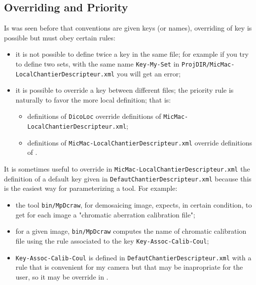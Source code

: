 \subsection{Overriding and Priority} 

Is was seen before that conventions are given keys (or names), overriding
of key is possible but must obey certain rules:

\begin{itemize}
   \item it is not possible to define twice a key in the same file; for example
         if you try to define two sets, with the same name {\tt Key-My-Set} in 
         {\tt ProjDIR/MicMac-LocalChantierDescripteur.xml}  you will get an error;

   \item it is possible to override a key between different files; the priority rule
         is naturally to favor the more local definition; that is: 

\begin{itemize}
             \item definitions of {\tt DicoLoc} override definitions of 
                    {\tt MicMac-LocalChantierDescripteur.xml};
             \item definitions of {\tt MicMac-LocalChantierDescripteur.xml}
                   override definitions of .
\end{itemize}

\end{itemize}

It is sometimes useful to override in {\tt MicMac-LocalChantierDescripteur.xml} the
definition of a default key given in {\tt DefautChantierDescripteur.xml} because this is 
the easiest way for parameterizing a tool. For example:

\begin{itemize}
    \item the tool {\tt bin/MpDcraw}, for demosaicing image, expects, in certain 
          condition, to get for each image a "chromatic aberration calibration file";

    \item  for 	a given image, {\tt bin/MpDcraw} computes the name of chromatic calibration file
           using the rule associated to the key {\tt Key-Assoc-Calib-Coul};

    \item  {\tt Key-Assoc-Calib-Coul} is defined in  {\tt DefautChantierDescripteur.xml} 
           with a rule that is convenient for my camera but that may be inapropriate
           for the user, so it may be override in .
\end{itemize}


